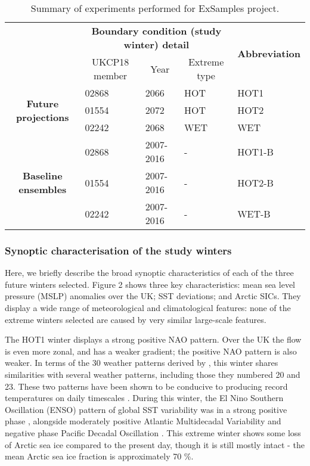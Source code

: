       \begin{table}[h]
        \centering
        \footnotesize
        \begin{tabular}{cllll}
          \toprule
          \multicolumn{1}{l}{\multirow{2}{*}{}}&\multicolumn{3}{c}{\textbf{Boundary condition (study winter) detail}}&\multicolumn{1}{c}{\multirow{2}{*}{\textbf{Abbreviation}}}\\\cmidrule(lr){2-4}
          \multicolumn{1}{l}{}&\multicolumn{1}{c}{UKCP18 member}&\multicolumn{1}{c}{Year}&\multicolumn{1}{c}{Extreme type}&\multicolumn{1}{c}{}\\\midrule
          \multirow{3}{*}{\textbf{Future projections}}&\multicolumn{1}{l}{02868}&\multicolumn{1}{l}{2066}&HOT&HOT1\\
          &\multicolumn{1}{l}{01554}&\multicolumn{1}{l}{2072}&HOT&HOT2\\
          &\multicolumn{1}{l}{02242}&\multicolumn{1}{l}{2068}&WET&WET\\\midrule
          \multirow{3}{*}{\textbf{Baseline ensembles}}&\multicolumn{1}{l}{02868}&\multicolumn{1}{l}{2007-2016}&-&HOT1-B\\
          &\multicolumn{1}{l}{01554}&\multicolumn{1}{l}{2007-2016}&-&HOT2-B\\
          &\multicolumn{1}{l}{02242}&\multicolumn{1}{l}{2007-2016}&-&WET-B\\\bottomrule
          \end{tabular}
        \caption{Summary of experiments performed for ExSamples project.}
        \end{table}

    \subsubsection{Synoptic characterisation of the study winters}

      Here, we briefly describe the broad synoptic characteristics of each of the three future winters selected. Figure 2 shows three key characteristics: mean sea level pressure (MSLP) anomalies over the UK; SST deviations; and Arctic SICs. They display a wide range of meteorological and climatological features: none of the extreme winters selected are caused by very similar large-scale features.

      The HOT1 winter displays a strong positive NAO pattern. Over the UK the flow is even more zonal, and has a weaker gradient; the positive NAO pattern is also weaker. In terms of the 30 weather patterns derived by \citep{neal_flexible_2016}, this winter shares similarities with several weather patterns, including those they numbered 20 and 23. These two patterns have been shown to be conducive to producing record temperatures on daily timescales \citep{kendon_temperature_2020}. During this winter, the El Nino Southern Oscillation (ENSO) pattern of global SST variability was in a strong positive phase , alongside moderately positive Atlantic Multidecadal Variability and negative phase Pacific Decadal Oscillation \citep{deser_sea_2010}. This extreme winter shows some loss of Arctic sea ice compared to the present day, though it is still mostly intact - the mean Arctic sea ice fraction is approximately 70 \%.

